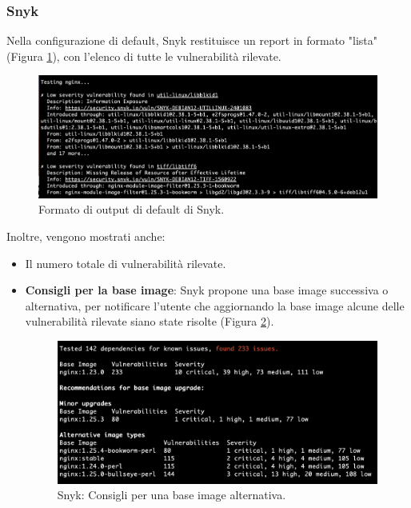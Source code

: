 \subsubsection{Snyk}
Nella configurazione di default, Snyk restituisce un report in formato "lista" (Figura \ref{fig:snyk_output_fmt}), con l'elenco di tutte le vulnerabilità rilevate.
\begin{figure}[H]
   \centering
   \includegraphics[width=1\textwidth]{immagini/capitolo2/snyk_output_fmt.png}
   \caption{Formato di output di default di Snyk.}
   \label{fig:snyk_output_fmt}
\end{figure}

Inoltre, vengono mostrati anche:
\begin{itemize}
   \item Il numero totale di vulnerabilità rilevate.
   \item \textbf{Consigli per la base image}: Snyk propone una base image successiva o alternativa, per notificare l'utente che aggiornando la base image alcune delle vulnerabilità rilevate siano state risolte (Figura \ref{fig:snyk_altn_imgs}).
         \begin{figure}[H]
            \centering
            \includegraphics[width=1\textwidth]{immagini/capitolo2/snyk_altn_images.png}
            \caption{Snyk: Consigli per una base image alternativa.}
            \label{fig:snyk_altn_imgs}
         \end{figure}
\end{itemize}

